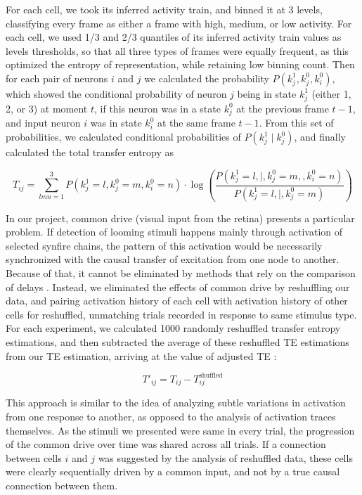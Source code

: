 \documentclass{article}
\begin{document}
For each cell, we took its inferred activity train, and binned it at 3 levels, classifying every frame as either a frame with high, medium, or low activity. For each cell, we used 1/3 and 2/3 quantiles of its inferred activity train values as levels thresholds, so that all three types of frames were equally frequent, as this optimized the entropy of representation, while retaining low binning count. Then for each pair of neurons $i$ and $j$ we calculated the probability $P(k_j^1,k_j^0,k_i^0)$, which showed the conditional probability of neuron $j$ being in state $k_j^1$ (either 1, 2, or 3) at moment $t$, if this neuron was in a state $k_j^0$ at the previous frame $t-1$, and  input neuron $i$ was in state $k_i^0$ at the same frame $t-1$. From this set of probabilities, we calculated conditional probabilities of $P(k_j^1 \mid k_j^0)$, and finally calculated the total transfer entropy as

\[ T_{ij} = \sum_{lmn=1}^3{P(k_j^1=l,k_j^0=m,k_i^0=n)}\cdot \log\left(\frac{P(k_j^1=l , \mid , k_j^0=m, , k_i^0=n)}{P(k_j^1=l , \mid , k_j^0=m)}\right) \]

In our project, common drive (visual input from the retina) presents a particular problem. If detection of looming stimuli happens mainly through activation of selected synfire chains, the pattern of this activation would be necessarily synchronized with the causal transfer of excitation from one node to another. Because of that, it cannot be eliminated by methods that rely on the comparison of delays \citep{wollstadt2014te}. Instead, we eliminated the effects of common drive by reshuffling our data, and pairing activation history of each cell with activation history of other cells for reshuffled, unmatching trials recorded in response to same stimulus type. For each experiment, we calculated 1000 randomly reshuffled transfer entropy estimations, and then subtracted the average of these reshuffled TE estimations from our TE estimation, arriving at the value of adjusted TE \citep{gourevitch2007te}:

\[ T'_{ij} = T_{ij} - T^\text{shuffled}_{ij} \]

This approach is similar to the idea of analyzing subtle variations in activation from one response to another, as opposed to the analysis of activation traces themselves. As the stimuli we presented were same in every trial, the progression of the common drive over time was shared across all trials. If a connection between cells $i$ and $j$ was suggested by the analysis of reshuffled data, these cells were clearly sequentially driven by a common input, and not by a true causal connection between them.
\end{document}
